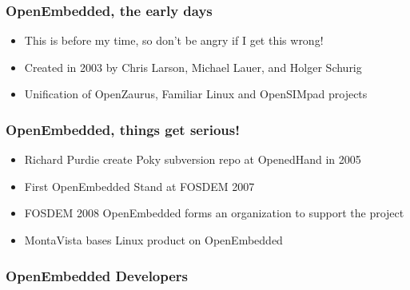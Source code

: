 \documentclass{beamer}
\begin{document}
\begin{frame}
\frametitle{OpenEmbedded, the early days}


	\begin{itemize}
		\item This is before my time, so don't be angry if I get this wrong!
		\item Created in 2003 by Chris Larson, Michael Lauer, and Holger Schurig
		\item Unification of OpenZaurus, Familiar Linux and OpenSIMpad projects
	\end{itemize}

\end{frame}

\begin{frame}
\frametitle{OpenEmbedded, things get serious! }

\begin{itemize}
	\item Richard Purdie create Poky subversion repo at OpenedHand in 2005
	\item First OpenEmbedded Stand at FOSDEM 2007
	\item FOSDEM 2008 OpenEmbedded forms an organization to support the project
	\item MontaVista bases Linux product on OpenEmbedded
\end{itemize}

\end{frame}

\begin{frame}
	\frametitle{OpenEmbedded Developers}


\end{frame}
\end{document}
